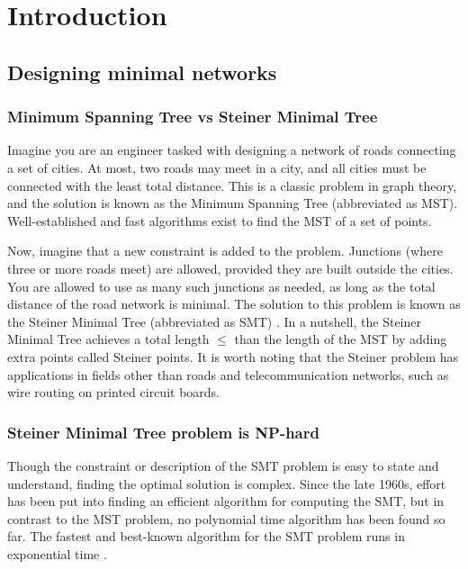 \documentclass{l4proj}
\begin{document}
\def\consentname {Pieter van Tuijl}
\def\consentdate {27 March 2025}
\educationalconsent


\tableofcontents

\chapter{Introduction}


\section{Designing minimal networks}
\subsection{Minimum Spanning Tree vs Steiner Minimal Tree}
Imagine you are an engineer tasked with designing a network of roads connecting a set of cities. At most, two roads may meet in a city, and all cities must be connected with the least total distance. This is a classic problem in graph theory, and the solution is known as the Minimum Spanning Tree (abbreviated as MST). Well-established and fast algorithms exist to find the MST of a set of points.

Now, imagine that a new constraint is added to the problem. Junctions (where three or more roads meet) are allowed, provided they are built outside the cities. You are allowed to use as many such junctions as needed, as long as the total distance of the road network is minimal. The solution to this problem is known as the Steiner Minimal Tree (abbreviated as SMT) \citep{MelzakAlgo}.
In a nutshell, the Steiner Minimal Tree achieves a total length  $\leq$ than the length of the MST by adding extra points called Steiner points.
It is worth noting that the Steiner problem has applications in fields other than roads and telecommunication networks, such as wire routing on printed circuit boards.

\subsection{Steiner Minimal Tree problem is NP-hard}
Though the constraint or description of the SMT problem is easy to state and understand, finding the optimal solution is complex.
Since the late 1960s, effort has been put into finding an efficient algorithm for computing the SMT, but in contrast to the MST problem, no polynomial time algorithm has been found so far. The fastest and best-known algorithm for the SMT problem runs in exponential time \citep{geosteiner96}.
\end{document}
